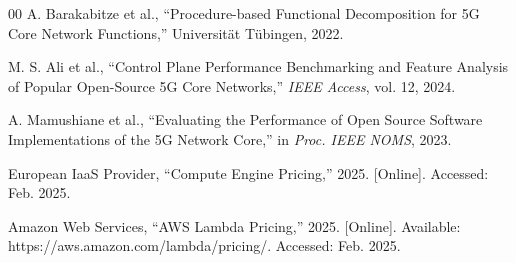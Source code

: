 \documentclass[conference]{IEEEtran}
\begin{document}
\begin{thebibliography}{00}
A. Barakabitze et al., ``Procedure-based Functional Decomposition for 5G Core Network Functions,'' Universit\"{a}t T\"{u}bingen, 2022.

M. S. Ali et al., ``Control Plane Performance Benchmarking and Feature Analysis of Popular Open-Source 5G Core Networks,'' \textit{IEEE Access}, vol. 12, 2024.

A. Mamushiane et al., ``Evaluating the Performance of Open Source Software Implementations of the 5G Network Core,'' in \textit{Proc. IEEE NOMS}, 2023.

European IaaS Provider, ``Compute Engine Pricing,'' 2025. [Online]. Accessed: Feb. 2025.

Amazon Web Services, ``AWS Lambda Pricing,'' 2025. [Online]. Available: https://aws.amazon.com/lambda/pricing/. Accessed: Feb. 2025.

\end{thebibliography}

\balance
\end{document}
